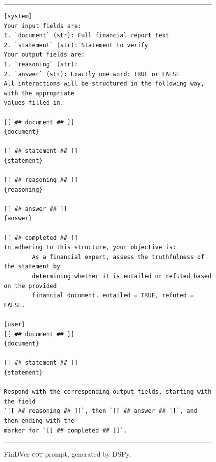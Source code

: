 \documentclass[11pt]{article}
\begin{document}
\begin{figure}[H]
\centering
\begin{minipage}{0.92\textwidth}
\footnotesize
\hrule\vspace{4pt}
\begin{verbatim}
[system]
Your input fields are:
1. `document` (str): Full financial report text
2. `statement` (str): Statement to verify
Your output fields are:
1. `reasoning` (str):
2. `answer` (str): Exactly one word: TRUE or FALSE
All interactions will be structured in the following way, with the appropriate
values filled in.

[[ ## document ## ]]
{document}

[[ ## statement ## ]]
{statement}

[[ ## reasoning ## ]]
{reasoning}

[[ ## answer ## ]]
{answer}

[[ ## completed ## ]]
In adhering to this structure, your objective is:
        As a financial expert, assess the truthfulness of the statement by
        determining whether it is entailed or refuted based on the provided
        financial document. entailed = TRUE, refuted = FALSE.

[user]
[[ ## document ## ]]
{document}

[[ ## statement ## ]]
{statement}

Respond with the corresponding output fields, starting with the field
`[[ ## reasoning ## ]]`, then `[[ ## answer ## ]]`, and then ending with the
marker for `[[ ## completed ## ]]`.
\end{verbatim}
\vspace{2pt}\hrule
\end{minipage}
\caption{FinDVer \textsc{cot} prompt, generated by DSPy.}
\label{fig:prompt_fv_cot}
\end{figure}
\end{document}
